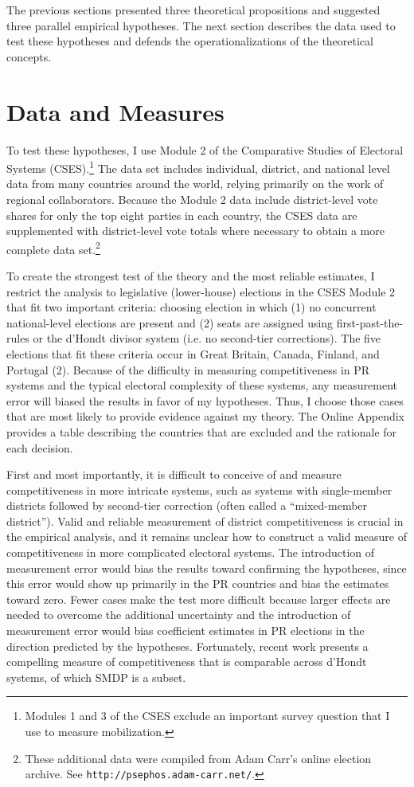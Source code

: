 \documentclass[12pt]{article}
\begin{document}
The previous sections presented three theoretical propositions and suggested three parallel empirical hypotheses. The next section describes the data used to test these hypotheses and defends the operationalizations of the theoretical concepts. 

\section*{Data and Measures}

To test these hypotheses, I use Module 2 of the Comparative Studies of Electoral Systems (CSES).\footnote{Modules 1 and 3 of the CSES exclude an important survey question that I use to measure mobilization.} The data set includes individual, district, and national level data from many countries around the world, relying primarily on the work of regional collaborators. Because the Module 2 data include district-level vote shares for only the top eight parties in each country, the CSES data are supplemented with district-level vote totals where necessary to obtain a more complete data set.\footnote{These additional data were compiled from Adam Carr's online election archive. See \texttt{http://psephos.adam-carr.net/}.}

To create the strongest test of the theory and the most reliable estimates, I restrict the analysis to legislative (lower-house) elections in the CSES Module 2 that fit two important criteria: choosing election in which (1) no concurrent national-level elections are present and (2) seats are assigned using first-past-the-rules or the d'Hondt divisor system (i.e. no second-tier corrections). The five elections that fit these criteria occur in Great Britain, Canada, Finland, and Portugal (2). Because of the difficulty in measuring competitiveness in PR systems and the typical electoral complexity of these systems, any measurement error will biased the results in favor of my hypotheses. Thus, I choose those cases that are most likely to provide evidence against my theory. The Online Appendix provides a table describing the countries that are excluded and the rationale for each decision.

First and most importantly, it is difficult to conceive of and measure competitiveness in more intricate systems, such as systems with single-member districts followed by second-tier correction (often called a ``mixed-member district''). Valid and reliable measurement of district competitiveness is crucial in the empirical analysis, and it remains unclear how to construct a valid measure of competitiveness in more complicated electoral systems. The introduction of measurement error would bias the results toward confirming the hypotheses, since this error would show up primarily in the PR countries and bias the estimates toward zero. Fewer cases make the test more difficult because larger effects are needed to overcome the additional uncertainty and the introduction of measurement error would bias coefficient estimates in PR elections in the direction predicted by the hypotheses. Fortunately, recent work \citep{GrofmanSelb2009} presents a compelling measure of competitiveness that is comparable across d'Hondt systems, of which SMDP is a subset. 
\end{document}
